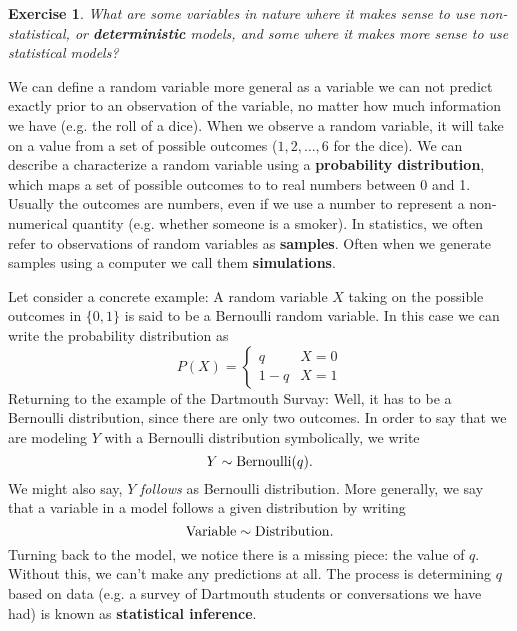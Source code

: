 \documentclass{amsart}
\newtheorem{exercise}{Exercise}
\begin{document}
\begin{exercise}
What are some variables in nature where it makes sense to use non-statistical, or {\bf deterministic} models, and some where it makes more sense to use statistical models? 
\end{exercise}

We can define a random variable more general as a variable we can not predict exactly prior to an observation of the variable, no matter how much information we have (e.g. the roll of a dice).  When we observe a random variable, it will take on a value from a set of possible outcomes ($1,2,\dots,6$ for the dice). We can describe a characterize a random variable using  a {\bf probability distribution}, which maps a set of possible outcomes to to real numbers between 0 and 1. Usually the outcomes are numbers, even if we use a number to represent a non-numerical quantity (e.g. whether someone is a smoker).  In statistics, we often refer to observations of random variables as {\bf samples}.  Often when we generate samples using a computer we call them {\bf simulations}. 


 Let consider a concrete example: A random variable $X$ taking on the possible outcomes in $\{0,1\}$ is said to be a Bernoulli random variable. In this case we can write the probability distribution as 
\begin{equation}
P(X) = \left\{ \begin{array}{cc}
q & X=0\\
1-q & X=1
\end{array}
 \right.
\end{equation}
Returning to the example of the Dartmouth Survay: Well, it has to be a Bernoulli distribution, since there are only two outcomes. In order to say that we are modeling $Y$ with a Bernoulli distribution symbolically, we write 
\begin{equation}
Y \sim {\rm Bernoulli}(q).
\end{equation}
We might also say, $Y$ \emph{follows} as Bernoulli distribution.
More generally, we say that a variable in a model follows a given distribution by writing 
\begin{equation}
{\rm Variable} \sim {\rm Distribution}. 
\end{equation}
  Turning back to the model, we notice there is a missing piece: the value of $q$. Without this, we can't make any predictions at all. The process is determining $q$ based on data (e.g. a survey of Dartmouth students or conversations we have had) is known as {\bf statistical inference}. 
\end{document}
